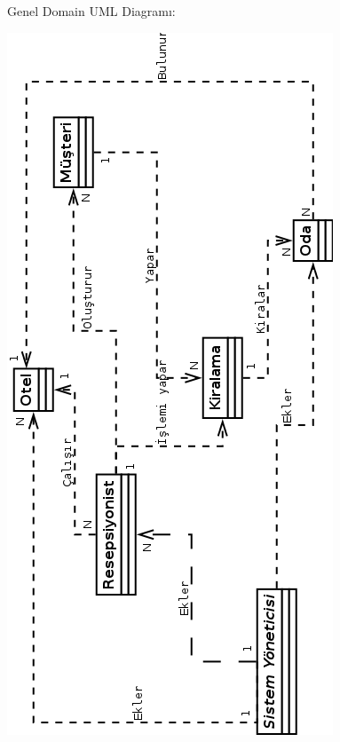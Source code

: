 \documentclass[12pt,a4paper]{report}
\begin{document}
\newpage
\begin{description}
\item[Genel Domain UML Diagramı: ] \hfill

\end{description}

\includegraphics{dia/allusecasessmall.png}
\end{document}
